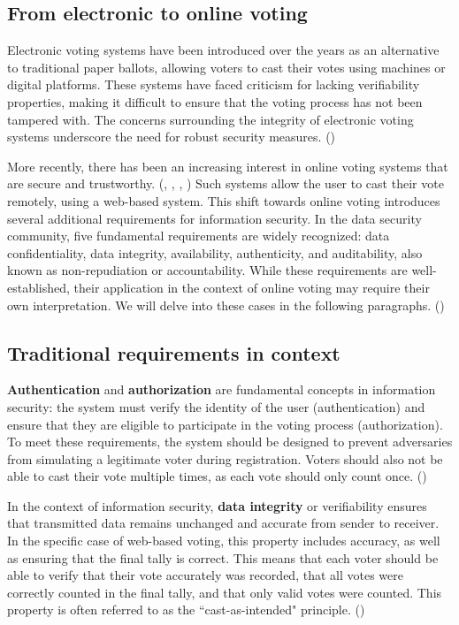 \documentclass[a4paper,12pt,english]{article}
\begin{document}
\subsection{From electronic to online voting}\label{sec:requirements-online}

Electronic voting systems have been introduced over the years as an alternative to traditional paper ballots, allowing voters to cast their votes using machines or digital platforms. These systems have faced criticism for lacking verifiability properties, making it difficult to ensure that the voting process has not been tampered with. The concerns surrounding the integrity of electronic voting systems underscore the need for robust security measures. (\cite{cryptoeprint:2016/287})

More recently, there has been an increasing interest in online voting systems that are secure and trustworthy. (\cite{10.1145/2660267.2660315}, \cite{10.1007/978-3-030-51280-4_3}, \cite{263858}, \cite{halderman2015new}) Such systems allow the user to cast their vote remotely, using a web-based system. This shift towards online voting introduces several additional requirements for information security. In the data security community, five fundamental requirements are widely recognized: data confidentiality, data integrity, availability, authenticity, and auditability, also known as non-repudiation or accountability. While these requirements are well-established, their application in the context of online voting may require their own interpretation. We will delve into these cases in the following paragraphs. (\cite{gerber-2001})

\subsection{Traditional requirements in context}\label{sec:requirements-context}

\textbf{Authentication} and \textbf{authorization} are fundamental concepts in information security: the system must verify the identity of the user (authentication) and ensure that they are eligible to participate in the voting process (authorization). To meet these requirements, the system should be designed to prevent adversaries from simulating a legitimate voter during registration. Voters should also not be able to cast their vote multiple times, as each vote should only count once. (\cite{NAP25120})

In the context of information security, \textbf{data integrity} or verifiability ensures that transmitted data remains unchanged and accurate from sender to receiver. In the specific case of web-based voting, this property includes accuracy, as well as ensuring that the final tally is correct. This means that each voter should be able to verify that their vote accurately was recorded, that all votes were correctly counted in the final tally, and that only valid votes were counted. This property is often referred to as the “cast-as-intended" principle. (\cite{4531164})
\end{document}

